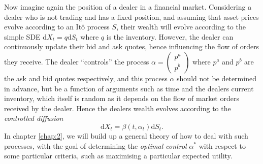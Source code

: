 Now imagine again the position of a dealer in a financial market. Considering a dealer
who is not trading and has a fixed position, and assuming that asset prices evolve
according to an It\^{o} process $S$, their wealth will evolve according to the simple 
SDE $\mathrm dX_t=q\mathrm dS_t$ where $q$ is the inventory. However, the dealer can 
continuously update their bid and ask quotes, hence influencing the flow of orders 
they receive. The dealer ``controls'' the process $\alpha=\begin{pmatrix}p^a\\p^b\end{pmatrix}$
where $p^a$ and $p^b$ are the ask and bid quotes respectively, and this process 
$\alpha$ should not be determined in advance, but be a function of arguments such 
as time and the dealers current inventory, which itself is random as it depends on the 
flow of market orders received by the dealer.
Hence the dealers wealth evolves according to the \emph{controlled diffusion}
\begin{equation*}
    \mathrm dX_t=\beta(t,\alpha_t)\mathrm dS_t.
\end{equation*}
In chapter \ref{chap:2}, we will build up a general theory of how to deal with 
such processes, with the goal of determining the \emph{optimal control} $\alpha^*$ with 
respect to some particular criteria, such as maximising a particular expected utility.
